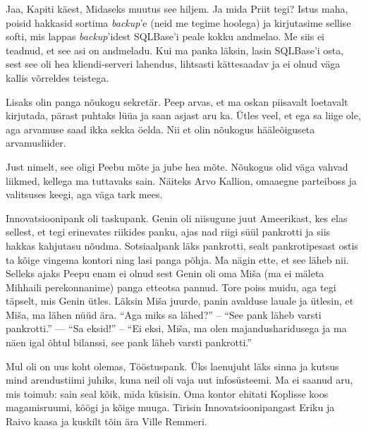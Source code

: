 
Jaa, Kapiti käest, Midaseks muutus see hiljem. Ja mida 
Priit tegi? Istus maha, poisid hakkasid sortima \emph{backup}'e (neid me 
tegime hoolega) ja kirjutasime sellise softi, mis lappas \emph{backup}'idest SQLBase'i 
peale kokku andmelao. Me siis ei teadnud, et see asi on andmeladu. Kui ma panka läksin, lasin SQLBase'i osta, sest see oli hea 
kliendi-serveri lahendus, lihtsasti kättesaadav ja ei olnud väga kallis võrreldes 
teistega. 

Lisaks olin panga nõukogu sekretär. Peep arvas, et ma oskan 
piisavalt loetavalt kirjutada, pärast puhtaks lüüa ja saan asjast aru 
ka. Ütles veel, et ega sa liige ole, aga arvamuse saad ikka sekka 
öelda. Nii et olin nõukogus hääleõiguseta arvamusliider.


Just nimelt, see oligi Peebu mõte ja jube hea mõte. Nõukogus 
olid väga vahvad liikmed, kellega ma tuttavaks sain. Näiteks Arvo 
Kallion, omaaegne
parteiboss ja valitsuses keegi, aga väga tark mees. 

Innovatsioonipank oli taskupank. Genin oli niisugune juut Ameerikast, kes 
elas sellest, et tegi erinevates riikides panku, ajas nad riigi süül 
pankrotti ja siis hakkas kahjutasu nõudma. 
Sotsiaalpank läks pankrotti, sealt pankrotipesast 
ostis ta kõige vingema kontori ning lasi panga põhja. Ma nägin ette, et see läheb nii. Selleks ajaks Peepu enam ei olnud 
sest Genin oli oma Miša (ma ei mäleta Mihhaili perekonnanime) panga etteotsa 
pannud. Tore poiss muidu, aga tegi täpselt, mis Genin ütles. Läksin Miša juurde, 
panin avalduse lauale ja ütlesin, et Miša, ma lähen nüüd ära. 
\enquote{Aga miks sa lähed?} -- \enquote{See pank läheb varsti pankrotti.} ---
\enquote{Sa eksid!} -- \enquote{Ei eksi, Miša, ma olen majandusharidusega ja ma 
näen igal õhtul bilanssi, see pank läheb varsti pankrotti.} 

Mul oli on uus koht olemas, Tööstuspank. Üks 
laenujuht läks sinna ja kutsus mind arendustiimi juhiks, kuna neil oli vaja uut 
infosüsteemi. Ma ei saanud aru, mis toimub: sain seal kõik, mida küsisin. Oma kontor ehitati Koplisse koos magamisruumi, köögi ja kõige muuga. Tirisin Innovatsioonipangast Eriku ja Raivo kaasa ja kuskilt tõin ära Ville Remmeri.

